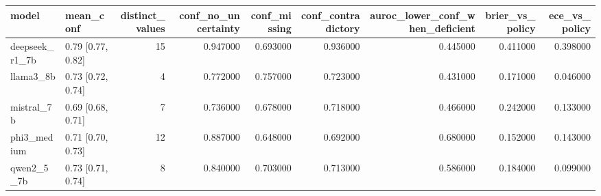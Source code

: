 \begin{tabular}{llrrrrrrr}
\toprule
model & mean\_conf & distinct\_values & conf\_no\_uncertainty & conf\_missing & conf\_contradictory & auroc\_lower\_conf\_when\_deficient & brier\_vs\_policy & ece\_vs\_policy \\
\midrule
deepseek\_r1\_7b & 0.79 [0.77, 0.82] & 15 & 0.947000 & 0.693000 & 0.936000 & 0.445000 & 0.411000 & 0.398000 \\
llama3\_8b & 0.73 [0.72, 0.74] & 4 & 0.772000 & 0.757000 & 0.723000 & 0.431000 & 0.171000 & 0.046000 \\
mistral\_7b & 0.69 [0.68, 0.71] & 7 & 0.736000 & 0.678000 & 0.718000 & 0.466000 & 0.242000 & 0.133000 \\
phi3\_medium & 0.71 [0.70, 0.73] & 12 & 0.887000 & 0.648000 & 0.692000 & 0.680000 & 0.152000 & 0.143000 \\
qwen2\_5\_7b & 0.73 [0.71, 0.74] & 8 & 0.840000 & 0.703000 & 0.713000 & 0.586000 & 0.184000 & 0.099000 \\
\bottomrule
\end{tabular}
